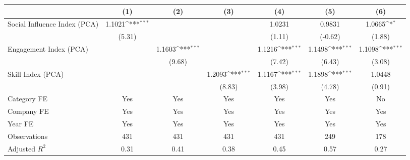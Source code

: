 {
\def\sym#1{\ifmmode^{#1}\else\(^{#1}\)\fi}
\begin{tabular}{l*{6}{c}}
\hline\hline
                                   &\multicolumn{1}{c}{(1)}         &\multicolumn{1}{c}{(2)}         &\multicolumn{1}{c}{(3)}         &\multicolumn{1}{c}{(4)}         &\multicolumn{1}{c}{(5)}         &\multicolumn{1}{c}{(6)}         \\
\hline
Social Influence Index (PCA)       &      1.1021\sym{***}&                     &                     &      1.0231         &      0.9831         &      1.0665\sym{*}  \\
                                   &      (5.31)         &                     &                     &      (1.11)         &     (-0.62)         &      (1.88)         \\
[1em]
Engagement Index (PCA)             &                     &      1.1603\sym{***}&                     &      1.1216\sym{***}&      1.1498\sym{***}&      1.1098\sym{***}\\
                                   &                     &      (9.68)         &                     &      (7.42)         &      (6.43)         &      (3.08)         \\
[1em]
Skill Index (PCA)                  &                     &                     &      1.2093\sym{***}&      1.1167\sym{***}&      1.1898\sym{***}&      1.0448         \\
                                   &                     &                     &      (8.83)         &      (3.98)         &      (4.78)         &      (0.91)         \\
[1em]
Category FE                        &         Yes         &         Yes         &         Yes         &         Yes         &         Yes         &          No         \\
[1em]
Company FE                         &         Yes         &         Yes         &         Yes         &         Yes         &         Yes         &         Yes         \\
[1em]
Year FE                            &         Yes         &         Yes         &         Yes         &         Yes         &         Yes         &         Yes         \\
\hline
Observations                       &         431         &         431         &         431         &         431         &         249         &         178         \\
Adjusted \(R^{2}\)                 &        0.31         &        0.41         &        0.38         &        0.45         &        0.57         &        0.27         \\
\hline\hline
\end{tabular}
}
